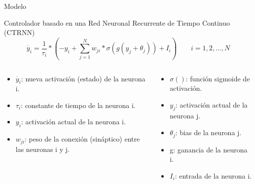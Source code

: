 \documentclass[aspectratio=169]{beamer}
\begin{document}
\begin{frame}{Modelo}
  \begin{block}{Controlador basado en una Red Neuronal Recurrente de Tiempo Continuo (CTRNN)}
    \begin{equation*}
    	\dot{y_{i}}= \frac{1}{\tau_{i}} * \left ( -y_{i}+\sum_{j=1}^{N}w_{ji}*\sigma \left ( g(y_{j} + \theta _{j}) \right ) + I_{i} \right ) \qquad i =1,2,...,N
    \end{equation*}
    \begin{columns}
      \begin{column}{0.47\textwidth}
          \begin{itemize}
            \item $\dot{y_{i}}$: nueva activación (estado) de la neurona i.
            \item $\tau_{i}$: constante de tiempo de la neurona i.
            \item $y_{i}$: activación actual de la neurona i.
            \item $w_{ji}$: peso de la conexión (sináptico) entre las neuronas i y j.
          \end{itemize}
      \end{column}
      \begin{column}{0.5\textwidth}
        \begin{itemize}
          \item $\sigma ()$: función sigmoide de activación.
          \item $y_{j}$: activación actual de la neurona j.
          \item $\theta_{j}$: bias de la neurona j.
          \item g: ganancia de la neurona i.
          \item $I_{i}$: entrada de la neurona i.
        \end{itemize}
      \end{column}
    \end{columns}
  \end{block}
\end{frame}
\end{document}
